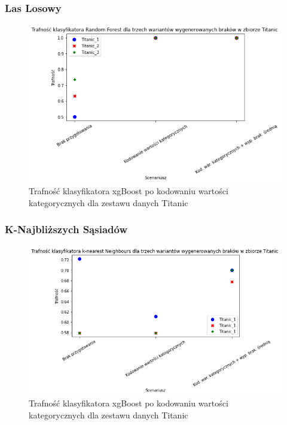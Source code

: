\documentclass{book}
\begin{document}
\subsubsection{Las Losowy}

\begin{figure}[H]
    \centerline{\includegraphics[scale=0.5]{Titanic_rfc_Kodowanie}}
    \centering
    \caption{Trafność klasyfikatora xgBoost po kodowaniu wartości kategorycznych dla zestawu danych Titanic}
    \end{figure}
    
\subsubsection{K-Najbliższych Sąsiadów}
\begin{figure}[H]
    \centerline{\includegraphics[scale=0.5]{Titanic_knn_Kodowanie}}
    \centering
    \caption{Trafność klasyfikatora xgBoost po kodowaniu wartości kategorycznych dla zestawu danych Titanic}
    \end{figure}
\end{document}
